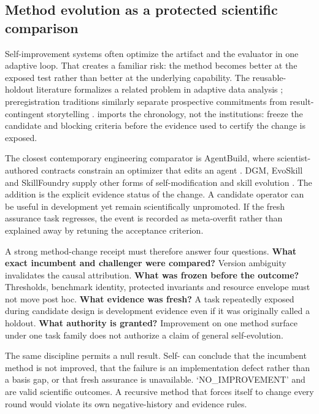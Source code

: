 \subsection{Method evolution as a protected scientific comparison}

Self-improvement systems often optimize the artifact and the evaluator in one adaptive loop. That creates a familiar risk: the method becomes better at the exposed test rather than better at the underlying capability. The reusable-holdout literature formalizes a related problem in adaptive data analysis \cite{dwork2015}; preregistration traditions similarly separate prospective commitments from result-contingent storytelling \cite{nosek2018}. \RAKL{} imports the chronology, not the institutions: freeze the candidate and blocking criteria before the evidence used to certify the change is exposed.

The closest contemporary engineering comparator is AgentBuild, where scientist-authored contracts constrain an optimizer that edits an agent \cite{shin2026agentbuild}. DGM, EvoSkill and SkillFoundry supply other forms of self-modification and skill evolution \cite{zhang2025,alzubi2026,shen2026}. The \RAKL{} addition is the explicit evidence status of the change. A candidate operator can be useful in development yet remain scientifically unpromoted. If the fresh assurance task regresses, the event is recorded as meta-overfit rather than explained away by retuning the acceptance criterion.

A strong method-change receipt must therefore answer four questions. \textbf{What exact incumbent and challenger were compared?} Version ambiguity invalidates the causal attribution. \textbf{What was frozen before the outcome?} Thresholds, benchmark identity, protected invariants and resource envelope must not move post hoc. \textbf{What evidence was fresh?} A task repeatedly exposed during candidate design is development evidence even if it was originally called a holdout. \textbf{What authority is granted?} Improvement on one method surface under one task family does not authorize a claim of general self-evolution.

The same discipline permits a null result. Self-\RAKL{} can conclude that the incumbent method is not improved, that the failure is an implementation defect rather than a basis gap, or that fresh assurance is unavailable. `NO\_IMPROVEMENT' and \CannotCheck{} are valid scientific outcomes. A recursive method that forces itself to change every round would violate its own negative-history and evidence rules.
